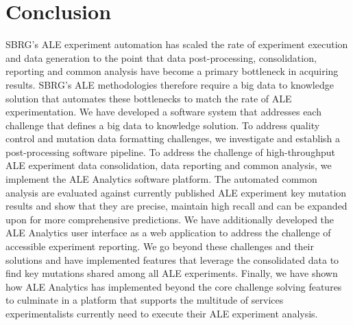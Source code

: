 \documentclass[12pt,final,masters,chapterheads]{ucsd}  %
\begin{document}

\chapter{Conclusion}
SBRG's ALE experiment automation has scaled the rate of experiment execution and data generation to the point that data post-processing, consolidation, reporting and common analysis have become a primary bottleneck in acquiring results. SBRG's ALE methodologies therefore require a big data to knowledge solution that automates these bottlenecks to match the rate of ALE experimentation. We have developed a software system that addresses each challenge that defines a big data to knowledge solution. To address quality control and mutation data formatting challenges, we investigate and establish a post-processing software pipeline. To address the challenge of high-throughput ALE experiment data consolidation, data reporting and common analysis, we implement the ALE Analytics software platform. The automated common analysis are evaluated against currently published ALE experiment key mutation results and show that they are precise, maintain high recall and can be expanded upon for more comprehensive predictions. We have additionally developed the ALE Analytics user interface as a web application to address the challenge of accessible experiment reporting. We go beyond these challenges and their solutions and have implemented features that leverage the consolidated data to find key mutations shared among all ALE experiments. Finally, we have shown how ALE Analytics has implemented beyond the core challenge solving features to culminate in a platform that supports the multitude of services experimentalists currently need to execute their ALE experiment analysis.
\end{document}
